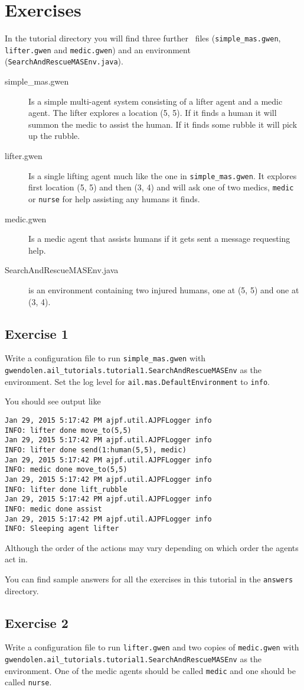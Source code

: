 \documentclass[a4]{article}
\begin{document}
\section{Exercises}
In the tutorial directory you will find three further \gwendolen\ files (\texttt{simple\_mas.gwen}, \texttt{lifter.gwen} and \texttt{medic.gwen}) and an environment (\texttt{SearchAndRescueMASEnv.java}).  
\begin{description}
\item[simple\_mas.gwen] Is a simple multi-agent system consisting of a lifter agent and a medic agent.  The lifter explores a location (5, 5).  If it finds a human it will summon the medic to assist the human.  If it finds some rubble it will pick up the rubble.
\item[lifter.gwen] Is a single lifting agent much like the one in \texttt{simple\_mas.gwen}.  It explores first location (5, 5) and then (3, 4) and will ask one of two medics, \texttt{medic} or \texttt{nurse} for help assisting any humans it finds.
\item[medic.gwen] Is a medic agent that assists humans if it gets sent a message requesting help.
\item[SearchAndRescueMASEnv.java] is an environment containing two injured humans, one at (5, 5) and one at (3, 4).
\end{description}

\subsection{Exercise 1}
\begin{sloppypar}
Write a configuration file to run \texttt{simple\_mas.gwen} with \texttt{gwendolen.ail\_tutorials.tutorial1.SearchAndRescueMASEnv} as the environment.  Set the log level for \texttt{ail.mas.DefaultEnvironment} to \texttt{info}.
\end{sloppypar}

You should see output like
\begin{verbatim}
Jan 29, 2015 5:17:42 PM ajpf.util.AJPFLogger info
INFO: lifter done move_to(5,5)
Jan 29, 2015 5:17:42 PM ajpf.util.AJPFLogger info
INFO: lifter done send(1:human(5,5), medic)
Jan 29, 2015 5:17:42 PM ajpf.util.AJPFLogger info
INFO: medic done move_to(5,5)
Jan 29, 2015 5:17:42 PM ajpf.util.AJPFLogger info
INFO: lifter done lift_rubble
Jan 29, 2015 5:17:42 PM ajpf.util.AJPFLogger info
INFO: medic done assist
Jan 29, 2015 5:17:42 PM ajpf.util.AJPFLogger info
INFO: Sleeping agent lifter
\end{verbatim}
Although the order of the actions may vary depending on which order the agents act in.

You can find sample answers for all the exercises in this tutorial in the \texttt{answers} directory.

\subsection{Exercise 2}
Write a configuration file to run \texttt{lifter.gwen} and two copies of \texttt{medic.gwen}  with \texttt{gwendolen.ail\_tutorials.tutorial1.SearchAndRescueMASEnv} as the environment.  One of the medic agents should be called \texttt{medic} and one should be called \texttt{nurse}.
\end{document}
